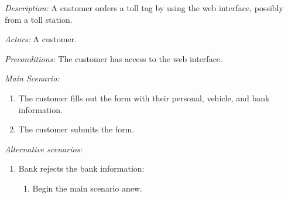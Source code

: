 \textit {Description: } A customer orders a toll tag by using the web interface, possibly from a toll station.

\textit {Actors: } A customer.

\textit {Preconditions: } The customer has access to the web interface.

\textit{Main Scenario: }

\begin{enumerate}
	\item The customer fills out the form with their personal, vehicle, and bank information.
	\item The customer submits the form.
\end{enumerate}

\textit{Alternative scenarios: }

\begin{enumerate}
	\item Bank rejects the bank information:
	\begin{enumerate}
		\item Begin the main scenario anew.
	\end{enumerate}
\end{enumerate}